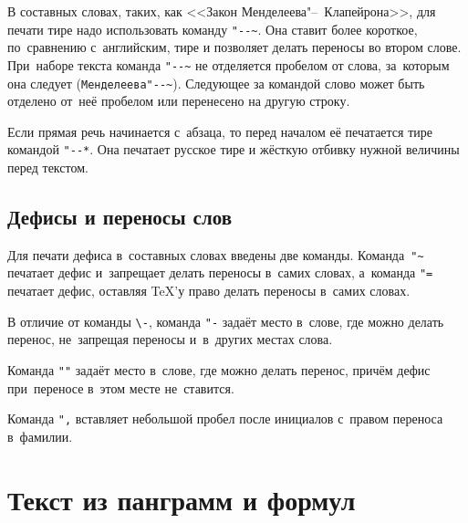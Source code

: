 В составных словах, таких, как <<Закон Менделеева"--~Клапейрона>>, для печати
тире надо использовать команду \verb|"--~|. Она ставит более короткое,
по~сравнению с~английским, тире и позволяет делать переносы во втором слове.
При~наборе текста команда \verb|"--~| не отделяется пробелом от слова,
за~которым она следует (\verb|Менделеева"--~|). Следующее за командой слово
может быть  отделено от~неё пробелом или перенесено на другую строку.

Если прямая речь начинается с~абзаца, то перед началом её печатается тире
командой \verb|"--*|. Она печатает русское тире и жёсткую отбивку нужной
величины перед текстом.

\subsection{Дефисы и переносы слов}
Для печати дефиса в~составных словах введены две команды. Команда~\verb|"~|
печатает дефис и~запрещает делать переносы в~самих словах, а~команда \verb|"=|
печатает дефис, оставляя \TeX ’у право делать переносы в~самих словах.

В отличие от команды \verb|\-|, команда \verb|"-| задаёт место в~слове, где
можно делать перенос, не~запрещая переносы и~в~других местах слова.

Команда \verb|""| задаёт место в~слове, где можно делать перенос, причём дефис
при~переносе в~этом месте не~ставится.

Команда \verb|",| вставляет небольшой пробел после инициалов с~правом переноса
в~фамилии.

\section{Текст из панграмм и формул}

